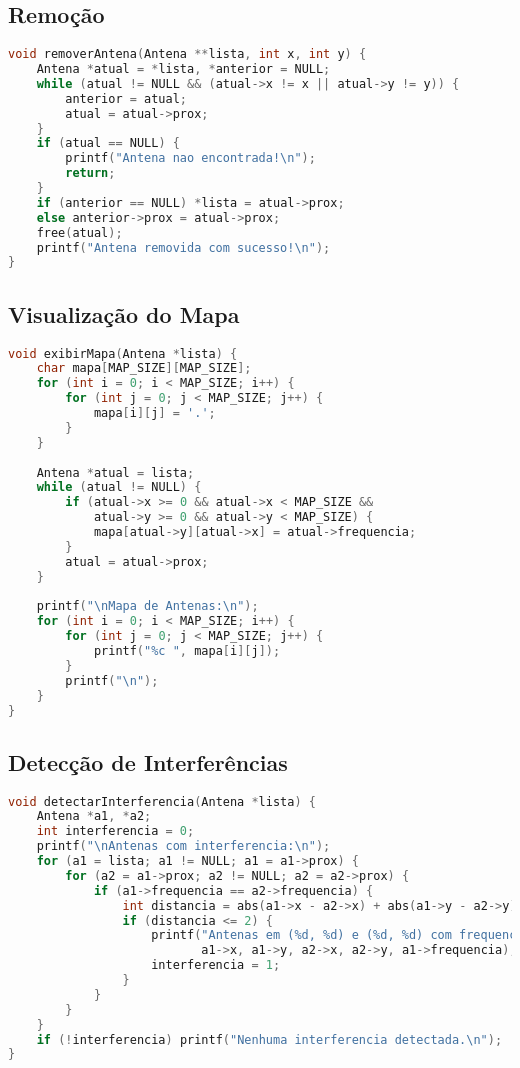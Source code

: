 \documentclass[a4paper, 12pt]{report}
\begin{document}
\subsection{Remoção}
\begin{lstlisting}[language=C, caption=Função removerAntena]
void removerAntena(Antena **lista, int x, int y) {
    Antena *atual = *lista, *anterior = NULL;
    while (atual != NULL && (atual->x != x || atual->y != y)) {
        anterior = atual;
        atual = atual->prox;
    }
    if (atual == NULL) {
        printf("Antena nao encontrada!\n");
        return;
    }
    if (anterior == NULL) *lista = atual->prox;
    else anterior->prox = atual->prox;
    free(atual);
    printf("Antena removida com sucesso!\n");
}
\end{lstlisting}

\subsection{Visualização do Mapa}
\begin{lstlisting}[language=C, caption=Função exibirMapa]
void exibirMapa(Antena *lista) {
    char mapa[MAP_SIZE][MAP_SIZE];
    for (int i = 0; i < MAP_SIZE; i++) {
        for (int j = 0; j < MAP_SIZE; j++) {
            mapa[i][j] = '.';
        }
    }
    
    Antena *atual = lista;
    while (atual != NULL) {
        if (atual->x >= 0 && atual->x < MAP_SIZE && 
            atual->y >= 0 && atual->y < MAP_SIZE) {
            mapa[atual->y][atual->x] = atual->frequencia;
        }
        atual = atual->prox;
    }
    
    printf("\nMapa de Antenas:\n");
    for (int i = 0; i < MAP_SIZE; i++) {
        for (int j = 0; j < MAP_SIZE; j++) {
            printf("%c ", mapa[i][j]);
        }
        printf("\n");
    }
}
\end{lstlisting}

\subsection{Detecção de Interferências}
\begin{lstlisting}[language=C, caption=Função detectarInterferencia]
void detectarInterferencia(Antena *lista) {
    Antena *a1, *a2;
    int interferencia = 0;
    printf("\nAntenas com interferencia:\n");
    for (a1 = lista; a1 != NULL; a1 = a1->prox) {
        for (a2 = a1->prox; a2 != NULL; a2 = a2->prox) {
            if (a1->frequencia == a2->frequencia) {
                int distancia = abs(a1->x - a2->x) + abs(a1->y - a2->y);
                if (distancia <= 2) {
                    printf("Antenas em (%d, %d) e (%d, %d) com frequencia '%c'\n", 
                           a1->x, a1->y, a2->x, a2->y, a1->frequencia);
                    interferencia = 1;
                }
            }
        }
    }
    if (!interferencia) printf("Nenhuma interferencia detectada.\n");
}
\end{lstlisting}
\end{document}
